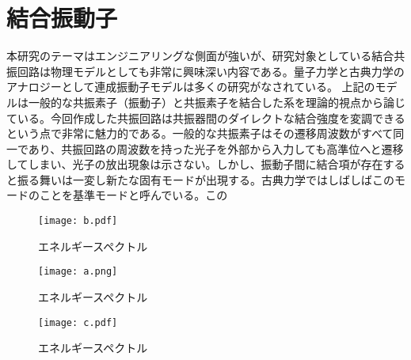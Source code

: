 \section{結合振動子}
    本研究のテーマはエンジニアリングな側面が強いが、研究対象としている結合共振回路は物理モデルとしても非常に興味深い内容である。量子力学と古典力学のアナロジーとして連成振動子モデルは多くの研究がなされている。\cite*{Rodriguez2016}\cite*{Ivakhnenko2018}\cite*{Novotny2010}
    上記のモデルは一般的な共振素子（振動子）と共振素子を結合した系を理論的視点から論じている。今回作成した共振回路は共振器間のダイレクトな結合強度を変調できるという点で非常に魅力的である。一般的な共振素子はその遷移周波数がすべて同一であり、共振回路の周波数を持った光子を外部から入力しても高準位へと遷移してしまい、光子の放出現象は示さない。しかし、振動子間に結合項が存在すると振る舞いは一変し新たな固有モードが出現する。古典力学ではしばしばこのモードのことを基準モードと呼んでいる。この
    \begin{figure}[H]
        \centering
        \texttt{[image: b.pdf]}
        \caption{エネルギースペクトル}
    \end{figure}
    \begin{figure}[H]
        \centering
        \texttt{[image: a.png]}
        \caption{エネルギースペクトル}
    \end{figure}
    \begin{figure}[H]
        \centering
        \texttt{[image: c.pdf]}
        \caption{エネルギースペクトル}
    \end{figure}


